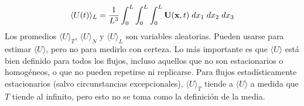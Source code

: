 $$\langle U(t) \rangle_L = \frac{1}{L^3} \int_0^{L} \int_0^{L} \int_0^{L} \mathbf{U}(\mathbf{x},t) \hspace*{1mm} dx_1 \hspace*{1mm} dx_2 \hspace*{1mm} dx_3$$
Los promedios $\langle U \rangle_T$, $\langle U \rangle_N$ y $\langle U \rangle_L$ son variables aleatorias. Pueden usarse para estimar $ \langle U \rangle$, pero no para medirlo con certeza. Lo más importante es que  $\langle U \rangle$ está bien definido para todos los flujos, incluso aquellos que no son estacionarios o homogéneos, o que no pueden repetirse ni replicarse. Para flujos estadísticamente estacionarios (salvo circunstancias excepcionales), $\langle U \rangle_T$ tiende a $\langle U \rangle$ a medida que $T$ tiende al infinito, pero esto no se toma como la definición de la media.


